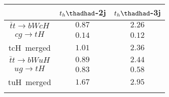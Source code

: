 \centering
\begin{tabular}{ccc} \toprule\toprule
 & $t_{h}\thadhad$-2j& $t_{h}\thadhad$-3j\\\midrule
$\bar{t}t\to bWcH$ &  $0.87$ & $2.26$  \\
$cg\to tH$ &          $0.14$ & $0.12$ \\
tcH~merged &          $1.01$ & $2.36$ \\
$\bar{t}t\to bWuH$ &  $0.89$ & $2.44$ \\
$ug\to tH$ &          $0.83$ & $0.58$  \\
tuH~merged &          $1.67$ & $2.95$  \\
\bottomrule\bottomrule\\
\end{tabular}


